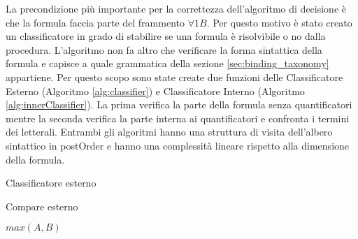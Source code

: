 \documentclass[./main.tex]{subfiles}
\begin{document}
La precondizione più importante per la correttezza dell'algoritmo di decisione è che la formula faccia parte del frammento $\forall1B$.
Per questo motivo è stato creato un classificatore in grado di stabilire se una formula è risolvibile o no dalla procedura.
L'algoritmo non fa altro che verificare la forma sintattica della formula e capisce a quale grammatica della sezione \ref{sec:binding_taxonomy}
appartiene. Per questo scopo sono state create due funzioni delle Classificatore Esterno (Algoritmo \ref{alg:classifier}) e Classificatore Interno (Algoritmo \ref{alg:innerClassifier}).
La prima verifica la parte della formula senza quantificatori mentre la seconda verifica la parte interna ai quantificatori e confronta 
i termini dei letterali. 
Entrambi gli algoritmi hanno una struttura di visita dell'albero sintattico in postOrder e hanno una complessità lineare rispetto alla dimensione della formula.


\begin{algorithm}[H] \label{alg:classifier}
\caption{Classificatore esterno}

\end{algorithm}
\begin{algorithm}[H] \label{alg:compare}
    \caption{Compare esterno}
\Return $max(A, B)$\;

\end{algorithm}
\end{document}
